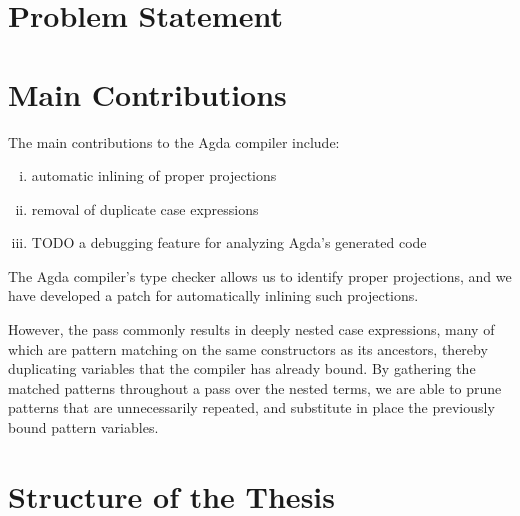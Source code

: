 \section{Problem Statement}
\label{sec:problem_statement}



\section{Main Contributions}
\label{sec:main_contributions}

The main contributions to the Agda compiler include:
\begin{enumerate}[(i)]
	\item automatic inlining of proper projections
	\item removal of duplicate case expressions
	\item TODO a debugging feature for analyzing Agda's generated code
\end{enumerate}

The Agda compiler's type checker allows us to identify proper projections, and we have developed a patch for automatically inlining such projections.\newline

However, the pass commonly results in deeply nested case expressions, many of which are pattern matching on the same constructors as its ancestors, thereby duplicating variables that the compiler has already bound. By gathering the matched patterns throughout a pass over the nested terms, we are able to prune patterns that are unnecessarily repeated, and substitute in place the previously bound pattern variables.\newline


\section{Structure of the Thesis}
\label{sec:structure_of_the_thesis}

